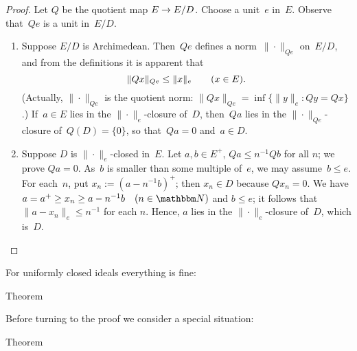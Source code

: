 \documentclass[main.tex]{subfiles}
\begin{document}
\begin{proof}
Let $Q$ be the quotient map $E\rightarrow E/D$.
Choose a unit~$e$ in~$E$.
Observe that~$Qe$ is a unit in~$E/D$.
\begin{enumerate}[label=(\Roman*)]
\item \label{4.9-I}
Suppose $E/D$ is Archimedean.
Then~$Qe$ defines a norm~$\|\cdot\|_{Qe}$ on~$E/D$,
and from the definitions it is apparent that
\begin{equation*}
\|Qx\|_{Qe} \leq \| x \|_e \qquad (x\in E)\text{.}
\end{equation*}
(Actually,
$\|\cdot\|_{Qe}$ is the quotient norm:
$\|Qx\|_{Qe}=\inf\{ \|y\|_e\colon Qy=Qx\}$.)
If~$a\in E$ lies in the $\|\cdot\|_e$-closure of~$D$,
then~$Qa$ lies in the $\|\cdot\|_{Qe}$-closure of~$Q(D)=\{0\}$,
so that~$Qa=0$ and~$a\in D$.
%
\item \label{4.9-II}
Suppose $D$ is $\|\cdot\|_e$-closed in~$E$.
Let $a,b\in E^+$, 
$Qa\leq n^{-1} Qb$ for all $n$;
we prove $Qa=0$.
As~$b$ is smaller than some multiple of~$e$,
we may assume~$b\leq e$.
For each~$n$, 
put $x_n := (a-n^{-1}b)^+$;
then $x_n \in D$
because $Qx_n=0$.
We have $a=a^+ \geq x_n \geq a-n^{-1} b\quad (n\in \N)$
and $b\leq e$;
it follows that $\| a - x_n \|_e\leq n^{-1}$ for each $n$.
Hence, $a$ lies in the $\|\cdot\|_e$-closure of~$D$,
which is~$D$. \xqed
\end{enumerate}
\end{proof}
%
%
\noindent For uniformly closed ideals everything is fine:
\begin{psec}{4.10}{Theorem}
\end{psec}
%
%
\noindent Before turning to the proof
we consider a special situation:
\begin{psec}{4.11}{Theorem}
%
\end{psec}
\end{document}
